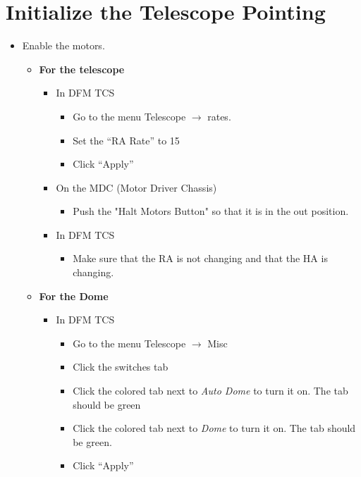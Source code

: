 \documentclass[letterpaper, 12pt]{report}
\begin{document}
\section{Initialize the Telescope Pointing}
\begin{itemize}
	\item Enable the motors.
		\begin{itemize}
			\item \textbf{For the telescope}
			\begin{itemize}
				\item In DFM TCS
				\begin{itemize}
					\item Go to the menu Telescope $\rightarrow$ rates.
					\item Set the ``RA Rate'' to 15
					\item Click ``Apply''
				\end{itemize}
				\item On the MDC (Motor Driver Chassis)
				\begin{itemize}
					\item Push the "Halt Motors Button" so that it is in the out position.
				\end{itemize}
				\end{itemize}
				\begin{itemize}
					\item In DFM TCS
					\begin{itemize}
						\item Make sure that the RA is not changing and that the HA is changing.
					\end{itemize}
				\end{itemize}
				\end{itemize}
				\begin{itemize}
					\item \textbf{For the Dome}
					\begin{itemize}
						\item In DFM TCS
						\begin{itemize}
							\item Go to the menu Telescope $\rightarrow$ Misc
							\item Click the switches tab
							\item Click the colored tab next to \emph{Auto Dome} to turn it on. The tab should be green
							\item Click the colored tab next to \emph{Dome} to turn it on. The tab should be green.
							\item Click ``Apply''

\end{itemize}
\end{itemize}
\end{itemize}
\end{itemize}
\end{document}
